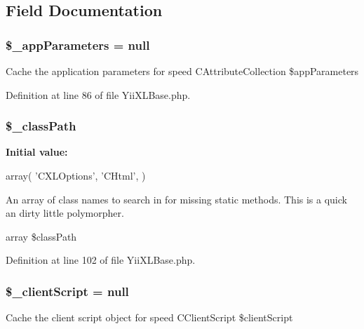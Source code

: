 \subsection{Field Documentation}
\hypertarget{classYiiXLBase_ace966ab0b5f00686b49f86b4d4a664a2}{
\subsubsection[{\$\_\-appParameters}]{\setlength{\rightskip}{0pt plus 5cm}\$\_\-appParameters = null}}
\label{classYiiXLBase_ace966ab0b5f00686b49f86b4d4a664a2}
Cache the application parameters for speed  CAttributeCollection \$appParameters 

Definition at line 86 of file YiiXLBase.php.

\hypertarget{classYiiXLBase_a3f47ff234cfea41e28e030bbf75c56eb}{
\subsubsection[{\$\_\-classPath}]{\setlength{\rightskip}{0pt plus 5cm}\$\_\-classPath}}
\label{classYiiXLBase_a3f47ff234cfea41e28e030bbf75c56eb}
{\bfseries Initial value:}
\begin{DoxyCode}
 array(
    'CXLOptions',
    'CHtml',
  )
\end{DoxyCode}
An array of class names to search in for missing static methods. This is a quick an dirty little polymorpher.

array \$classPath 

Definition at line 102 of file YiiXLBase.php.

\hypertarget{classYiiXLBase_a7e5fa1f4672a5a8a8ddb2d96bea86daa}{
\subsubsection[{\$\_\-clientScript}]{\setlength{\rightskip}{0pt plus 5cm}\$\_\-clientScript = null}}
\label{classYiiXLBase_a7e5fa1f4672a5a8a8ddb2d96bea86daa}
Cache the client script object for speed  CClientScript \$clientScript 


